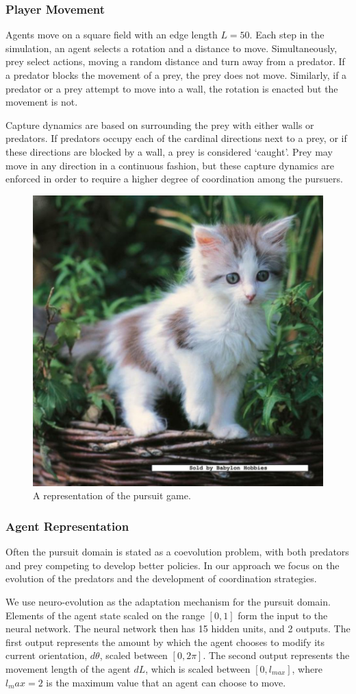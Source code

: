 \documentclass{aamas2014}
\begin{document}
\subsubsection{Player Movement}

Agents move on a square field with an edge length $L=50$. Each step in the simulation, an agent selects a rotation and a distance to move. Simultaneously, prey select actions, moving a random distance and turn away from a predator. If a predator blocks the movement of a prey, the prey does not move. Similarly, if a predator or a prey attempt to move into a wall, the rotation is enacted but the movement is not.

Capture dynamics are based on surrounding the prey with either walls or predators. If predators occupy each of the cardinal directions next to a prey, or if these directions are blocked by a wall, a prey is considered `caught'.  Prey may move in any direction in a continuous fashion, but these capture dynamics are enforced in order to require a higher degree of coordination among the pursuers.


\begin{figure}[h!]
\includegraphics[width=.5\textwidth]{pics/kitten}
\caption{A representation of the pursuit game.}
\label{fig:game}
\end{figure}

\subsubsection{Agent Representation}

Often the pursuit domain is stated as a coevolution problem, with both predators and prey competing to develop better policies. In our approach we focus on the evolution of the predators and the development of coordination strategies.

We use neuro-evolution as the adaptation mechanism for the pursuit domain. Elements of the agent state scaled on the range $[0,1]$ form the input to the neural network. The neural network then has 15 hidden units, and 2 outputs. The first output represents the amount by which the agent chooses to modify its current orientation, $d\theta$, scaled between $[0,2\pi]$. The second output represents the movement length of the agent $dL$, which is scaled between $[0,l_{max}]$, where $l_max=2$ is the maximum value that an agent can choose to move.
\end{document}

